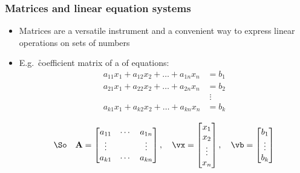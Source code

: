 \begin{frame}
  \frametitle{Matrices and linear equation systems}

  \begin{itemize}
  \item Matrices are a versatile instrument and a convenient way to express
    linear operations on sets of numbers
  \item E.g.\ \h{coefficient matrix} of a  of equations:
    \begin{align*}
      a_{11} x_1 + a_{12} x_2 + \dots + a_{1n} x_n &= b_1 \\
      a_{21} x_1 + a_{22} x_2 + \dots + a_{2n} x_n &= b_2 \\
      & \;\vdots \\
      a_{k1} x_1 + a_{k2} x_2 + \dots + a_{kn} x_n &= b_k \\
    \end{align*}
    \pause\ungap[2]
    \[
    \text{\So} \quad \mathbf{A} =
    \begin{bmatrix}
      a_{11} & \cdots & a_{1n} \\
      \vdots & & \vdots \\
      a_{k1} & \cdots & a_{kn}
    \end{bmatrix}
    , \quad
    \vx =
    \begin{bmatrix}
      x_1\\ x_2\\ \vdots\\ x_n
    \end{bmatrix}
    , \quad
    \vb =
    \begin{bmatrix}
      b_1\\ \vdots\\ b_k
    \end{bmatrix}
    \]
  \end{itemize}
\end{frame}

